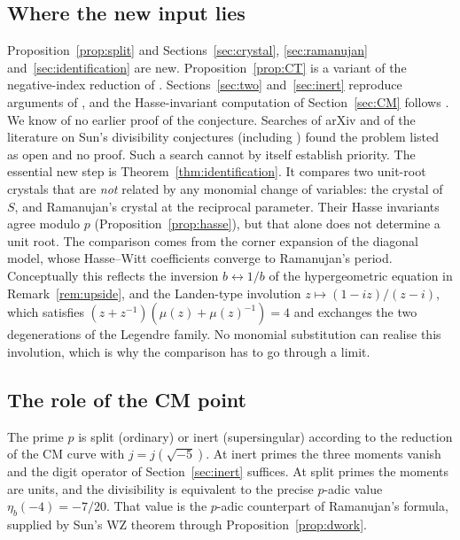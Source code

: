 \documentclass[11pt]{amsart}
\theoremstyle{definition}
\theoremstyle{remark}
\begin{document}
\subsection*{Where the new input lies}
Proposition~\ref{prop:split} and Sections~\ref{sec:crystal}, \ref{sec:ramanujan}
and~\ref{sec:identification} are new. Proposition~\ref{prop:CT} is a variant of the
negative-index reduction of \cite{K26}. Sections~\ref{sec:two} and~\ref{sec:inert} reproduce
arguments of \cite{K26}, and the Hasse-invariant computation of Section~\ref{sec:CM} follows
\cite{K26}. We know of no earlier proof of the conjecture. Searches of arXiv and of the literature
on Sun's divisibility conjectures (including \cite{SunEJC,OO,FC}) found the problem listed as open
and no proof. Such a search cannot by itself establish priority. The essential new step is
Theorem~\ref{thm:identification}. It compares two unit-root crystals that are \emph{not} related by
any monomial change of variables: the crystal of $S$, and Ramanujan's crystal at the reciprocal
parameter. Their Hasse invariants agree modulo $p$ (Proposition~\ref{prop:hasse}), but that alone
does not determine a unit root. The comparison comes from the corner expansion of the diagonal
model, whose Hasse--Witt coefficients converge to Ramanujan's period. Conceptually this reflects
the inversion $b\leftrightarrow1/b$ of the hypergeometric equation in Remark~\ref{rem:upside}, and
the Landen-type involution $z\mapsto(1-iz)/(z-i)$, which satisfies
$(z+z^{-1})(\mu(z)+\mu(z)^{-1})=4$ and exchanges the two degenerations of the Legendre family. No
monomial substitution can realise this involution, which is why the comparison has to go through
a limit.

\subsection*{The role of the CM point}
The prime $p$ is split (ordinary) or inert (supersingular) according to the reduction of the CM
curve with $j=j(\sqrt{-5})$. At inert primes the three moments vanish and the digit operator of
Section~\ref{sec:inert} suffices. At split primes the moments are units, and the divisibility is
equivalent to the precise $p$-adic value $\eta_b(-4)=-7/20$. That value is the $p$-adic counterpart
of Ramanujan's formula, supplied by Sun's WZ theorem through Proposition~\ref{prop:dwork}.
\end{document}

